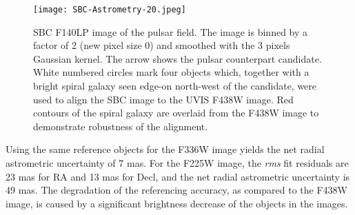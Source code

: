 \documentclass[pdftex,twocolumn]{aastex62}
\begin{document}
\begin{figure}[t!]
\begin{center}
\texttt{[image: SBC-Astrometry-20.jpeg]}
\caption{SBC F140LP image of the pulsar field. The image is 
binned by a factor of 2 (new pixel size 0) and 
smoothed with the 3 pixels Gaussian kernel. 
The arrow shows the pulsar counterpart candidate.
White numbered circles mark four objects  which, together with a bright spiral galaxy seen edge-on north-west  
of the candidate,  were used to align the SBC image to the UVIS F438W image. Red contours  of 
the spiral galaxy 
are overlaid from the F438W image to demonstrate robustness of the alignment.
\label{fig:2}} 
\end{center}
\end{figure} 
     
Using the same reference objects for 
the F336W image yields 
the net radial astrometric uncertainty 
of 7 mas. 
For the F225W image, the {\sl rms} fit 
residuals are 23 mas 
for RA and 13 mas for Decl, 
and the net radial astrometric 
uncertainty is 49 mas. 
The degradation of the referencing accuracy, 
as compared 
to the F438W image, is caused by a significant 
brightness  decrease of the objects   
in the images.
\end{document}
